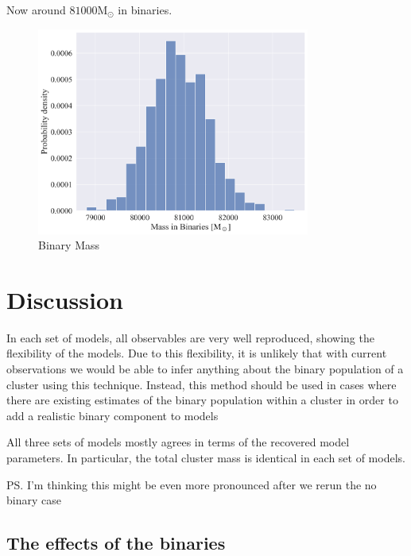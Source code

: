 Now around $81000 \mathrm{M}_\odot$ in binaries.

\begin{figure}
	\centering
	\includegraphics[width=0.8\textwidth]{figures/high_bin_model/binary_mass.png}
	\caption{Binary Mass}
	\label{fig:high_bin_model_Bin_mass}
\end{figure}





\section{Discussion}



In each set of models, all observables are very well reproduced, showing the flexibility of the
 models. Due to this flexibility, it is unlikely that with current observations we
would be able to infer anything about the binary population of a cluster using this technique.
Instead, this method should be used in cases where there are existing estimates of the binary
population within a cluster in order to add a realistic binary component to  models

All three sets of models mostly agrees in terms of the recovered model parameters. In particular,
the total cluster mass is identical in each set of models.

\ps{I'm thinking this might be even more pronounced after we rerun the no binary case}


\subsection{The effects of the binaries}



